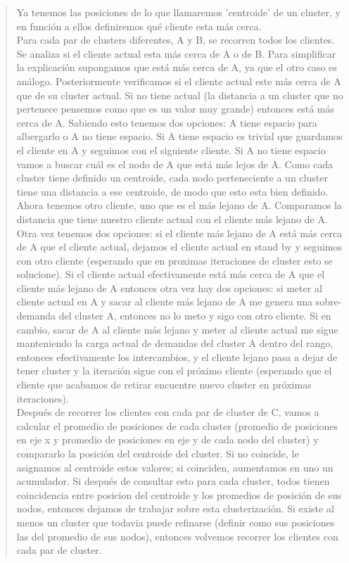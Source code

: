 \documentclass[11pt,a4paper]{article}
\begin{document}
\begin{verse}
Ya tenemos las posiciones de lo que llamaremos 'centroide' de un cluster, y en función a ellos definiremos qué cliente esta más cerca. \\ Para cada par de clusters diferentes, A y B, se recorren todos los clientes. Se analiza si el cliente actual esta más cerca de A o de B. Para simplificar la explicación supongamos que está más cerca de A, ya que el otro caso es análogo. Posteriormente verificamos si el cliente actual este más cerca de A que de su cluster actual. Si no tiene actual (la distancia a un cluster que no pertenece pensemos como que es un valor muy grande) entonces está más cerca de A. Sabiendo esto tenemos dos opciones: A tiene espacio para albergarlo o A no tiene espacio. Si A tiene espacio es trivial que guardamos el cliente en A y seguimos con el siguiente cliente. Si A no tiene espacio vamos a buscar cuál es el nodo de A que está más lejos de A. Como cada cluster tiene definido un centroide, cada nodo perteneciente a un cluster tiene una distancia a ese centroide, de modo que esto esta bien definido.  Ahora tenemos otro cliente, uno que es el más lejano de A. Comparamos la distancia que tiene nuestro cliente actual con el cliente más lejano de A. Otra vez tenemos dos opciones: si el cliente más lejano de A está más cerca de A que el cliente actual, dejamos el cliente actual en stand by y seguimos con otro cliente (esperando que en proximas iteraciones de cluster esto se solucione). Si el cliente actual efectivamente está más cerca de A que el cliente más lejano de A entonces otra vez hay dos opciones: si meter al cliente actual en A y sacar al cliente más lejano de A me genera una sobre-demanda del cluster A, entonces no lo meto y sigo con otro cliente. Si  en cambio, sacar de A al cliente más lejano y meter al cliente actual me sigue manteniendo la carga actual de demandas del cluster A dentro del rango, entonces efectivamente los intercambios, y el cliente lejano pasa a dejar de tener cluster y la iteración sigue con el próximo cliente (esperando que el cliente que acabamos de retirar encuentre nuevo cluster en próximas iteraciones).\\
Después de recorrer los clientes con cada par de cluster de C, vamos a calcular el promedio de posiciones de cada cluster (promedio de posiciones en eje x y promedio de posiciones en eje y de cada nodo del cluster) y compararlo la posición del centroide del cluster. Si no coincide, le asignamos al centroide estos valores; si coinciden, aumentamos en uno un acumulador. Si después de consultar esto para cada cluster, todos tienen coincidencia entre posicion del centroide y los promedios de posición de sus nodos, entonces dejamos de trabajar sobre esta clusterización. Si existe al menos un cluster que todavia puede refinarse (definir como sus posiciones las del promedio de sus nodos), entonces volvemos recorrer los clientes con cada par de cluster.\\ 

\end{verse}
\end{document}
